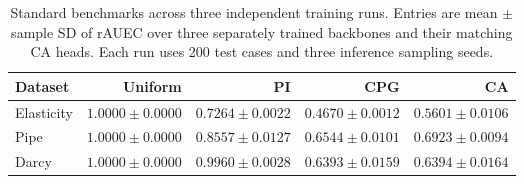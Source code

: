 \begin{table}[t]
\centering
\small
\begin{tabular}{lrrrr}
\toprule
Dataset & Uniform & PI & CPG & CA \\
\midrule
Elasticity & $1.0000\pm0.0000$ & $0.7264\pm0.0022$ & $0.4670\pm0.0012$ & $0.5601\pm0.0106$ \\
Pipe & $1.0000\pm0.0000$ & $0.8557\pm0.0127$ & $0.6544\pm0.0101$ & $0.6923\pm0.0094$ \\
Darcy & $1.0000\pm0.0000$ & $0.9960\pm0.0028$ & $0.6393\pm0.0159$ & $0.6394\pm0.0164$ \\
\bottomrule
\end{tabular}
\caption{Standard benchmarks across three independent training runs. Entries are mean $\pm$ sample SD of rAUEC over three separately trained backbones and their matching CA heads. Each run uses 200 test cases and three inference sampling seeds.}
\label{tab:standard_training_seeds}
\end{table}
